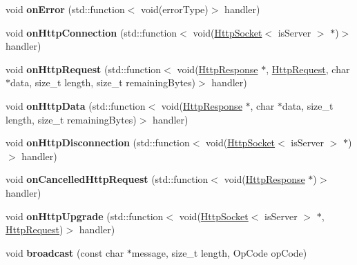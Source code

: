 \begin{DoxyCompactItemize}
void {\bfseries on\+Error} (std\+::function$<$ void(error\+Type)$>$ handler)
\item 
\mbox{\label{structu_w_s_1_1_group_a04ac338c51a997cc850807044c2defab}} 
void {\bfseries on\+Http\+Connection} (std\+::function$<$ void(\mbox{\hyperlink{structu_w_s_1_1_http_socket}{Http\+Socket}}$<$ is\+Server $>$ $\ast$)$>$ handler)
\item 
\mbox{\label{structu_w_s_1_1_group_a1ff984427167c8600551978b0d576967}} 
void {\bfseries on\+Http\+Request} (std\+::function$<$ void(\mbox{\hyperlink{structu_w_s_1_1_http_response}{Http\+Response}} $\ast$, \mbox{\hyperlink{structu_w_s_1_1_http_request}{Http\+Request}}, char $\ast$data, size\+\_\+t length, size\+\_\+t remaining\+Bytes)$>$ handler)
\item 
\mbox{\label{structu_w_s_1_1_group_ad80ef6245d90918c64d61b97e5b7ee72}} 
void {\bfseries on\+Http\+Data} (std\+::function$<$ void(\mbox{\hyperlink{structu_w_s_1_1_http_response}{Http\+Response}} $\ast$, char $\ast$data, size\+\_\+t length, size\+\_\+t remaining\+Bytes)$>$ handler)
\item 
\mbox{\label{structu_w_s_1_1_group_a13e4b9febf33fefb72a2a79a2dd82535}} 
void {\bfseries on\+Http\+Disconnection} (std\+::function$<$ void(\mbox{\hyperlink{structu_w_s_1_1_http_socket}{Http\+Socket}}$<$ is\+Server $>$ $\ast$)$>$ handler)
\item 
\mbox{\label{structu_w_s_1_1_group_ad4a255fecf96ecb5b917c1bf1b185459}} 
void {\bfseries on\+Cancelled\+Http\+Request} (std\+::function$<$ void(\mbox{\hyperlink{structu_w_s_1_1_http_response}{Http\+Response}} $\ast$)$>$ handler)
\item 
\mbox{\label{structu_w_s_1_1_group_a3c9c9394126894e5bbe3e2ebff6fee72}} 
void {\bfseries on\+Http\+Upgrade} (std\+::function$<$ void(\mbox{\hyperlink{structu_w_s_1_1_http_socket}{Http\+Socket}}$<$ is\+Server $>$ $\ast$, \mbox{\hyperlink{structu_w_s_1_1_http_request}{Http\+Request}})$>$ handler)
\item 
\mbox{\label{structu_w_s_1_1_group_a9cfa7523adc38b20020f2a04e909e3fc}} 
void {\bfseries broadcast} (const char $\ast$message, size\+\_\+t length, Op\+Code op\+Code)

\end{DoxyCompactItemize}
